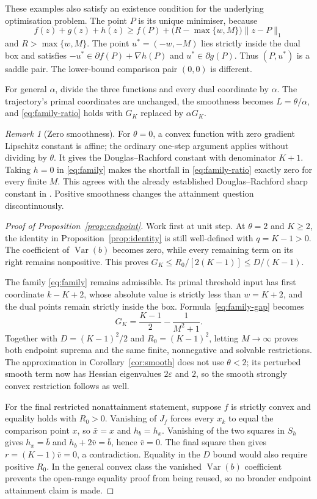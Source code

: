 \documentclass[11pt,a4paper]{article}
\theoremstyle{remark}\newtheorem{remark}[theorem]{Remark}
\DeclareMathOperator{\Var}{Var}
\newcommand{\norm}[1]{\lVert #1\rVert}
\begin{document}
These examples also satisfy an existence condition for the underlying optimisation problem. The point $P$ is its unique minimiser, because
\[
f(z)+g(z)+h(z)\ge f(P)+\bigl(R-\max\{w,M\}\bigr)\norm{z-P}_1
\]
and $R>\max\{w,M\}$. The point $u^*=(-w,-M)$ lies strictly inside the dual box and satisfies $-u^*\in\partial f(P)+\nabla h(P)$ and $u^*\in\partial g(P)$. Thus $(P,u^*)$ is a saddle pair. The lower-bound comparison pair $(0,0)$ is different.

For general $\alpha$, divide the three functions and every dual coordinate by $\alpha$. The trajectory's primal coordinates are unchanged, the smoothness becomes $L=\theta/\alpha$, and \eqref{eq:family-ratio} holds with $G_K$ replaced by $\alpha G_K$.

\begin{remark}[Zero smoothness]
For $\theta=0$, a convex function with zero gradient Lipschitz constant is affine; the ordinary one-step argument applies without dividing by $\theta$. It gives the Douglas--Rachford constant with denominator $K+1$. Taking $h=0$ in \eqref{eq:family} makes the shortfall in \eqref{eq:family-ratio} exactly zero for every finite $M$. This agrees with the already established Douglas--Rachford sharp constant in \cite{nguyen2025}. Positive smoothness changes the attainment question discontinuously.
\end{remark}

\begin{proof}[Proof of Proposition~\ref{prop:endpoint}]
Work first at unit step. At $\theta=2$ and $K\ge2$, the identity in Proposition~\ref{prop:identity} is still well-defined with $q=K-1>0$. The coefficient of $\Var(b)$ becomes zero, while every remaining term on its right remains nonpositive. This proves
$G_K\le R_0/[2(K-1)]\le D/(K-1)$.

The family \eqref{eq:family} remains admissible. Its primal threshold input has first coordinate $k-K+2$, whose absolute value is strictly less than $w=K+2$, and the dual points remain strictly inside the box. Formula~\eqref{eq:family-gap} becomes
\[
G_K=\frac{K-1}{2}-\frac1{M^2+1}.
\]
Together with $D=(K-1)^2/2$ and $R_0=(K-1)^2$, letting $M\to\infty$ proves both endpoint suprema and the same finite, nonnegative and solvable restrictions. The approximation in Corollary~\ref{cor:smooth} does not use $\theta<2$; its perturbed smooth term now has Hessian eigenvalues $2\varepsilon$ and $2$, so the smooth strongly convex restriction follows as well.

For the final restricted nonattainment statement, suppose $f$ is strictly convex and equality holds with $R_0>0$. Vanishing of $J_f$ forces every $x_k$ to equal the comparison point $x$, so $\bar x=x$ and $h_b=h_x$. Vanishing of the two squares in $S_h$ gives $h_x=\bar b$ and $h_b+2\bar v=\bar b$, hence $\bar v=0$. The final square then gives $r=(K-1)\bar v=0$, a contradiction. Equality in the $D$ bound would also require positive $R_0$. In the general convex class the vanished $\Var(b)$ coefficient prevents the open-range equality proof from being reused, so no broader endpoint attainment claim is made.
\end{proof}
\end{document}
